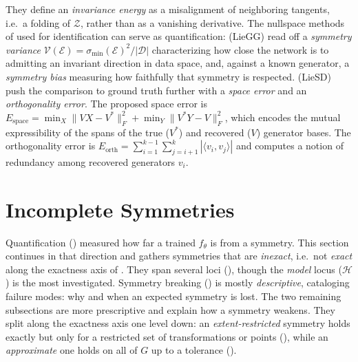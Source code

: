 \documentclass[mathematics,review,submit,moreauthors]{Definitions/mdpi}
\begin{document}
They define an \emph{invariance energy} as a misalignment of neighboring tangents, i.e.\ a folding of $\mathcal{Z}$, rather than as a vanishing derivative.
The nullspace methods of  used for identification can serve as quantification: \citet{moskalev2023} (LieGG) read off a \emph{symmetry variance} $\mathcal{V}(\mathcal{E}) = \sigma_{\min}(\mathcal{E})^2/|\mathcal{D}|$ characterizing how close the network is to admitting an invariant direction in data space, and, against a known generator, a \emph{symmetry bias} measuring how faithfully that symmetry is respected.
\citet{hu2025nn} (LieSD) push the comparison to ground truth further with a \emph{space error} and an \emph{orthogonality error}.
The proposed space error is $E_{\mathrm{space}} = \min_{X} \|VX - V^*\|_F^2 + \min_{Y} \|V^*Y - V\|_F^2$, which encodes the mutual expressibility of the spans of the true ($V^*$) and recovered ($V$) generator bases.
The orthogonality error is $E_{\mathrm{orth}} = \sum_{i=1}^{k-1} \sum_{j=i+1}^{k} |\langle v_i, v_j \rangle|$ and computes a notion of redundancy among recovered generators $v_i$.



\section{Incomplete Symmetries}\label{sec:incomplete-symmetries}
Quantification () measured how far a trained $f_\theta$ is from a symmetry.
This section continues in that direction and gathers symmetries that are \emph{inexact}, i.e.\ not \emph{exact} along the exactness axis of .
They span several loci (), though the \emph{model} locus ($\mathcal{H}$) is the most investigated.
Symmetry breaking () is mostly \emph{descriptive}, cataloging failure modes: why and when an expected symmetry is lost.
The two remaining subsections are more prescriptive and explain how a symmetry weakens.
They split along the exactness axis one level down: an \emph{extent-restricted} symmetry holds exactly but only for a restricted set of transformations or points (), while an \emph{approximate} one holds on all of $G$ up to a tolerance ().
\end{document}
